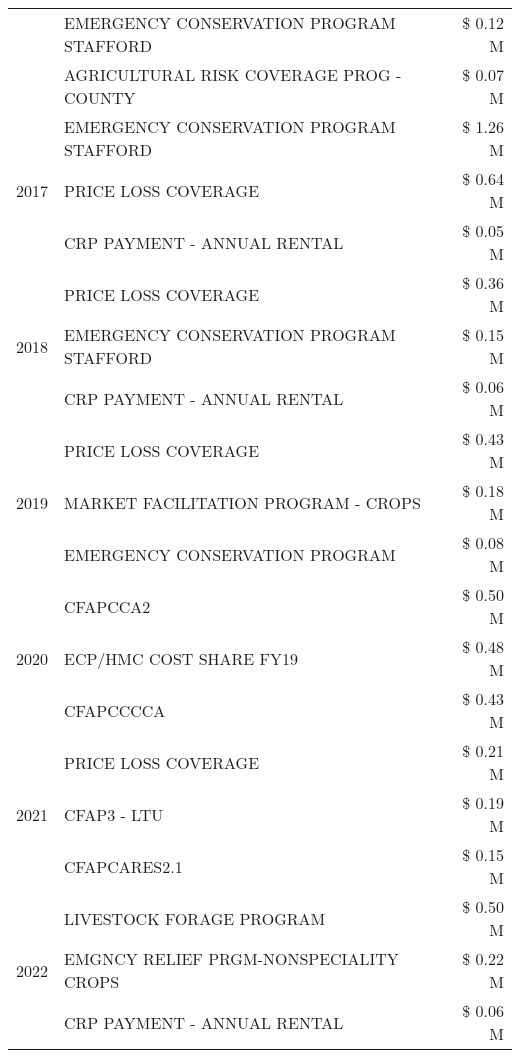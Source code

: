 \begin{tabular}{llr}
 & EMERGENCY CONSERVATION PROGRAM STAFFORD & \$ 0.12 M \\
 & AGRICULTURAL RISK COVERAGE PROG - COUNTY & \$ 0.07 M \\
\cline{1-3}
\multirow[t]{3}{*}{2017} & EMERGENCY CONSERVATION PROGRAM STAFFORD & \$ 1.26 M \\
 & PRICE LOSS COVERAGE & \$ 0.64 M \\
 & CRP PAYMENT - ANNUAL RENTAL & \$ 0.05 M \\
\cline{1-3}
\multirow[t]{3}{*}{2018} & PRICE LOSS COVERAGE & \$ 0.36 M \\
 & EMERGENCY CONSERVATION PROGRAM STAFFORD & \$ 0.15 M \\
 & CRP PAYMENT - ANNUAL RENTAL & \$ 0.06 M \\
\cline{1-3}
\multirow[t]{3}{*}{2019} & PRICE LOSS COVERAGE & \$ 0.43 M \\
 & MARKET FACILITATION PROGRAM - CROPS & \$ 0.18 M \\
 & EMERGENCY CONSERVATION PROGRAM & \$ 0.08 M \\
\cline{1-3}
\multirow[t]{3}{*}{2020} & CFAPCCA2 & \$ 0.50 M \\
 & ECP/HMC COST SHARE FY19 & \$ 0.48 M \\
 & CFAPCCCCA & \$ 0.43 M \\
\cline{1-3}
\multirow[t]{3}{*}{2021} & PRICE LOSS COVERAGE & \$ 0.21 M \\
 & CFAP3 - LTU & \$ 0.19 M \\
 & CFAPCARES2.1 & \$ 0.15 M \\
\cline{1-3}
\multirow[t]{3}{*}{2022} & LIVESTOCK FORAGE PROGRAM & \$ 0.50 M \\
 & EMGNCY RELIEF PRGM-NONSPECIALITY CROPS & \$ 0.22 M \\
 & CRP PAYMENT - ANNUAL RENTAL & \$ 0.06 M \\
\cline{1-3}
\bottomrule
\end{tabular}
